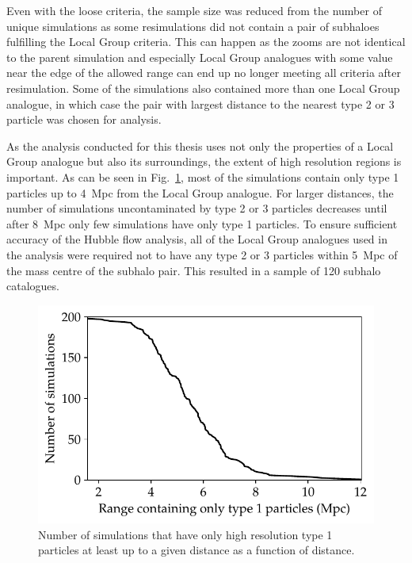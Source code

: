 \documentclass[english, twoside]{HYgradu}
\begin{document}
Even with the loose criteria, the sample size was reduced from the number of unique simulations as some resimulations did not contain a pair of subhaloes fulfilling the Local Group criteria. This can happen as the zooms are not identical to the parent simulation and especially Local Group analogues with some value near the edge of the allowed range can end up no longer meeting all criteria after resimulation. Some of the simulations also contained more than one Local Group analogue, in which case the pair with largest distance to the nearest type 2 or 3 particle was chosen for analysis.

As the analysis conducted for this thesis uses not only the properties of a Local Group analogue but also its surroundings, the extent of high resolution regions is important. As can be seen in Fig.\ \ref{fig:uncontaminatedDistances}, most of the simulations contain only type 1 particles up to 4~Mpc from the Local Group analogue. For larger distances, the number of simulations uncontaminated by type 2 or 3 particles decreases until after 8~Mpc only few simulations have only type 1 particles. To ensure sufficient accuracy of the Hubble flow analysis, all of the Local Group analogues used in the analysis were required not to have any type 2 or 3 particles within 5~Mpc of the mass centre of the subhalo pair. This resulted in a sample of 120 subhalo catalogues.


\begin{figure}
    \centering
    \includegraphics{kuvat/uncontaminatedDistances.pdf}
    \caption{Number of simulations that have only high resolution type 1 particles at least up to a given distance as a function of distance.}\label{fig:uncontaminatedDistances}
\end{figure}
\end{document}
